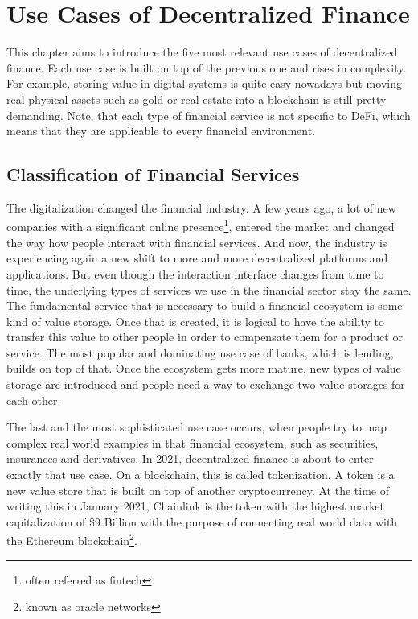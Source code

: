 \chapter{Use Cases of Decentralized Finance}
\label{cha:UseCasesDecentralizedFinance}

This chapter aims to introduce the five most relevant use cases of decentralized finance. Each use case is built on top of the previous one and rises in complexity. For example, storing value in digital systems is quite easy nowadays but moving real physical assets such as gold or real estate into a blockchain is still pretty demanding. Note, that each type of financial service is not specific to DeFi, which means that they are applicable to every financial environment.

\section{Classification of Financial Services}
The digitalization changed the financial industry. A few years ago, a lot of new companies with a significant online presence\footnote{often referred as fintech}, entered the market and changed the way how people interact with financial services. And now, the industry is experiencing again a new shift to more and more decentralized platforms and applications. But even though the interaction interface changes from time to time, the underlying types of services we use in the financial sector stay the same. The fundamental service that is necessary to build a financial ecosystem is some kind of value storage. Once that is created, it is logical to have the ability to transfer this value to other people in order to compensate them for a product or service. The most popular and dominating use case of banks, which is lending, builds on top of that. Once the ecosystem gets more mature, new types of value storage are introduced and people need a way to exchange two value storages for each other.

The last and the most sophisticated use case occurs, when people try to map complex real world examples in that financial ecosystem, such as securities, insurances and derivatives. In 2021, decentralized finance is about to enter exactly that use case. On a blockchain, this is called tokenization. A token is a new value store that is built on top of another cryptocurrency. At the time of writing this in January 2021, Chainlink \cite{Chainlink} is the token with the highest market capitalization of \$9 Billion \cite{CoinMarketCap2021} with the purpose of connecting real world data with the Ethereum blockchain\footnote{known as oracle networks}.


